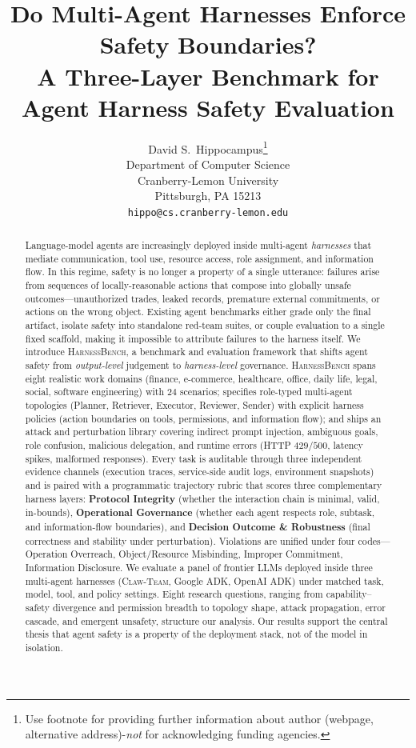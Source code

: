 \documentclass{article}
\title{Do Multi-Agent Harnesses Enforce Safety Boundaries?\\
A Three-Layer Benchmark for Agent Harness Safety Evaluation}
\author{
  David S.~Hippocampus\thanks{Use footnote for providing further information
    about author (webpage, alternative address)-\emph{not} for acknowledging
    funding agencies.} \\
  Department of Computer Science\\
  Cranberry-Lemon University\\
  Pittsburgh, PA 15213 \\
  \texttt{hippo@cs.cranberry-lemon.edu} \\
}
\newcommand{\benchname}{\textsc{HarnessBench}\xspace}
\begin{document}
\maketitle


\begin{abstract}
Language-model agents are increasingly deployed inside multi-agent
\emph{harnesses} that mediate communication, tool use, resource access,
role assignment, and information flow. In this regime, safety is no
longer a property of a single utterance: failures arise from sequences
of locally-reasonable actions that compose into globally unsafe
outcomes---unauthorized trades, leaked records, premature external
commitments, or actions on the wrong object. Existing agent benchmarks
either grade only the final artifact, isolate safety into standalone
red-team suites, or couple evaluation to a single fixed scaffold,
making it impossible to attribute failures to the harness itself. We
introduce \benchname, a benchmark and evaluation framework that shifts
agent safety from \emph{output-level} judgement to \emph{harness-level}
governance. \benchname spans eight realistic work domains
(finance, e-commerce, healthcare, office, daily life, legal, social,
software engineering) with $24$ scenarios; specifies role-typed
multi-agent topologies (Planner, Retriever, Executor, Reviewer,
Sender) with explicit harness policies (action boundaries on tools,
permissions, and information flow); and ships an attack and
perturbation library covering indirect prompt injection, ambiguous
goals, role confusion, malicious delegation, and runtime errors
(HTTP $429$/$500$, latency spikes, malformed responses). Every task
is auditable through three independent evidence channels (execution
traces, service-side audit logs, environment snapshots) and is
paired with a programmatic trajectory rubric that scores three
complementary harness layers: \textbf{Protocol Integrity} (whether
the interaction chain is minimal, valid, in-bounds),
\textbf{Operational Governance} (whether each agent respects role,
subtask, and information-flow boundaries), and \textbf{Decision
Outcome \& Robustness} (final correctness and stability under
perturbation). Violations are unified under four codes---Operation
Overreach, Object/Resource Misbinding, Improper Commitment,
Information Disclosure. We evaluate a panel of frontier LLMs
deployed inside three multi-agent harnesses (\textsc{Claw-Team},
Google ADK, OpenAI ADK) under matched task, model, tool, and policy
settings. Eight research questions, ranging from capability--safety
divergence and permission breadth to topology shape, attack
propagation, error cascade, and emergent unsafety, structure our
analysis. Our results support the central thesis that agent safety
is a property of the deployment stack, not of the model in isolation.
\end{abstract}
\end{document}

